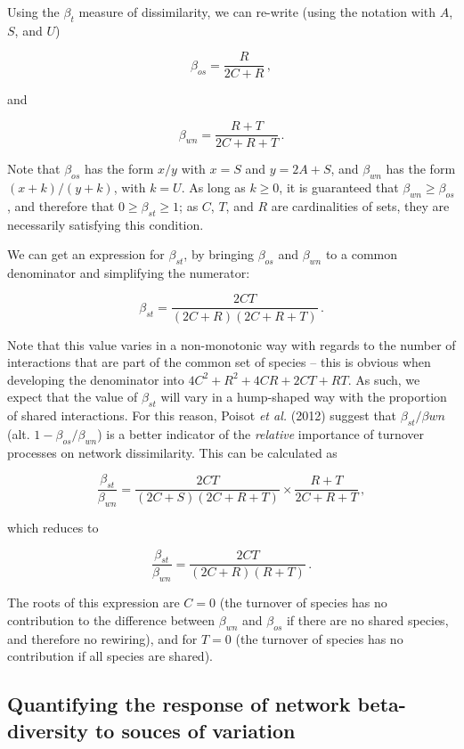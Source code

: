 \documentclass[11pt]{article}
\begin{document}
Using the \(\beta_t\) measure of dissimilarity, we can re-write (using
the notation with \(A\), \(S\), and \(U\))

\[\beta_{os} = \frac{R}{2C+R}\,,\]

and

\[\beta_{wn} = \frac{R+T}{2C+R+T}\,.\]

Note that \(\beta_{os}\) has the form \(x/y\) with \(x = S\) and
\(y = 2A+S\), and \(\beta_{wn}\) has the form \((x+k)/(y+k)\), with
\(k = U\). As long as \(k \ge 0\), it is guaranteed that
\(\beta_{wn} \ge \beta_{os}\), and therefore that
\(0 \ge \beta_{st} \ge 1\); as \(C\), \(T\), and \(R\) are cardinalities
of sets, they are necessarily satisfying this condition.

We can get an expression for \(\beta_{st}\), by bringing \(\beta_{os}\)
and \(\beta_{wn}\) to a common denominator and simplifying the
numerator:

\[\beta_{st} = \frac{2CT}{(2C+R)(2C+R+T)}\,.\]

Note that this value varies in a non-monotonic way with regards to the
number of interactions that are part of the common set of species --
this is obvious when developing the denominator into
\(4C^2 + R^2 + 4CR + 2CT + RT\). As such, we expect that the value of
\(\beta_{st}\) will vary in a hump-shaped way with the proportion of
shared interactions. For this reason, Poisot \emph{et al.} (2012)
suggest that \(\beta_{st}/\beta{wn}\) (alt. \(1-\beta_{os}/\beta_{wn}\))
is a better indicator of the \emph{relative} importance of turnover
processes on network dissimilarity. This can be calculated as

\[\frac{\beta_{st}}{\beta_{wn}} = \frac{2CT}{(2C+S)(2C+R+T)}\times\frac{R+T}{2C+R+T}\,,\]

which reduces to

\[\frac{\beta_{st}}{\beta_{wn}} = \frac{2CT}{(2C+R)(R+T)}\,.\]

The roots of this expression are \(C=0\) (the turnover of species has no
contribution to the difference between \(\beta_{wn}\) and \(\beta_{os}\)
if there are no shared species, and therefore no rewiring), and for
\(T = 0\) (the turnover of species has no contribution if all species
are shared).

\hypertarget{quantifying-the-response-of-network-beta-diversity-to-souces-of-variation}{%
\subsection{Quantifying the response of network beta-diversity to souces
of
variation}\label{quantifying-the-response-of-network-beta-diversity-to-souces-of-variation}}
\end{document}
